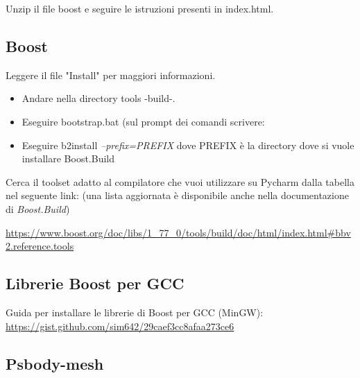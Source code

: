 \medskip

Unzip il file boost e seguire le istruzioni presenti in index.html.

\medskip

\subsection{Boost}

\medskip


Leggere il file "Install" per maggiori informazioni.

\medskip

\begin{itemize}
\item Andare nella directory tools -build-.
\item Eseguire bootstrap.bat (sul prompt dei comandi scrivere:  \\ 
\item Eseguire b2install \textit{--prefix=PREFIX} dove PREFIX è la directory dove si vuole installare Boost.Build\\ 
\end{itemize}


\medskip

Cerca il toolset adatto al compilatore che vuoi utilizzare su Pycharm dalla tabella nel seguente link: (una lista aggiornata è disponibile anche nella documentazione di \textit{Boost.Build})

\medskip

\url{https://www.boost.org/doc/libs/1_77_0/tools/build/doc/html/index.html#bbv2.reference.tools}

\medskip

\subsection{Librerie Boost per GCC}

\medskip

Guida per installare le librerie di Boost per GCC (MinGW): \\
\url{https://gist.github.com/sim642/29caef3cc8afaa273ce6}

\medskip

\subsection{Psbody-mesh}

\medskip

